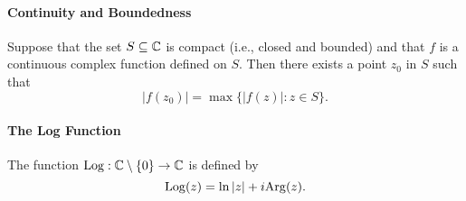 \paragraph{Continuity and Boundedness}
Suppose that the set \(S \subseteq \mathbb{C}\) is compact (i.e., closed and bounded) and that \(f\) is a continuous complex function defined on \(S\). Then there exists a point \(z_0\) in \(S\) such that
\[|f(z_0)| = \max\{|f(z)| : z \in S\}.\]

\paragraph{The Log Function}
The function \(\mathrm{Log}: \mathbb{C} \setminus \{0\} \to \mathbb{C}\) is defined by
\[\mathrm{Log}(z) = \ln|z| + i\mathrm{Arg}(z).\]